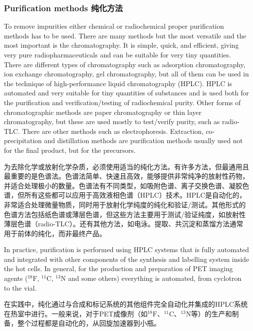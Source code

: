 \documentclass[dvipsnames, svgnames,a4paper,11pt]{article}
\begin{document}
\subsubsection{Purification methods 纯化方法}

To remove impurities either chemical or radiochemical proper purification methods
has to be used. There are many methods but the most versatile and the most
important is the chromatography. It is simple, quick, and efficient, giving very pure
radiopharmaceuticals and can be suitable for very tiny quantities. There are different
types of chromatography such as adsorption chromatography, ion exchange
chromatography, gel chromatography, but all of them can be used in the technique
of high-performance liquid chromatography (HPLC). HPLC is automated and very
suitable for tiny quantities of substances and is used both for the purification and
verification/testing of radiochemical purity. Other forms of chromatographic methods
are paper chromatography or thin layer chromatography, but these are used mostly
to test/verify purity, such as radio-TLC. There are other methods such as
electrophoresis. Extraction, co-precipitation and distillation methods are purification
methods usually used not for the final product, but for the precursors.

为去除化学或放射化学杂质，必须使用适当的纯化方法。有许多方法，但最通用且最重要的是色谱法。色谱法简单、快速且高效，能够提供非常纯净的放射性药物，并适合处理极小的数量。色谱法有不同类型，如吸附色谱、离子交换色谱、凝胶色谱，但所有这些都可以应用于高效液相色谱（HPLC）技术。HPLC是自动化的，非常适合处理微量物质，同时用于放射化学纯度的纯化和验证/测试。其他形式的色谱方法包括纸色谱或薄层色谱，但这些方法主要用于测试/验证纯度，如放射性薄层色谱（radio-TLC）。还有其他方法，如电泳。提取、共沉淀和蒸馏方法通常用于前体的纯化，而非最终产品。



In practice, purification is performed using HPLC systems that is fully automated and
integrated with other components of the synthesis and labelling system inside the hot
cells. In general, for the production and preparation of PET imaging agents (${}^{18}\mathrm{F}$, ${}^{11}\mathrm{C}$,
${}^{13}\mathrm{N}$ and some others) everything is automated, from cyclotron to the vial.

在实践中，纯化通过与合成和标记系统的其他组件完全自动化并集成的HPLC系统在热室中进行。一般来说，对于PET成像剂（如${}^{18}\mathrm{F}$、${}^{11}\mathrm{C}$、${}^{13}\mathrm{N}$等）的生产和制备，整个过程都是自动化的，从回旋加速器到小瓶。
\end{document}
